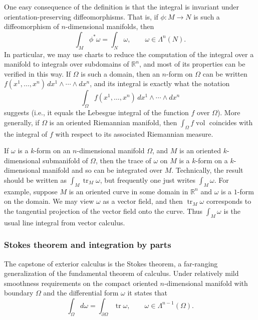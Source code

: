 {One easy consequence of the definition is that the integral is invariant under orientation-preserving diffeomorphisms. That is, if $\phi:M\to N$ is such a diffeomorphism of $n$-dimensional manifolds, then}
\begin{equation}\label{eq:integration-pullback-invariance}
\int_M\phi^*\omega=\int_N\omega,\qquad\omega\in\Lambda^n(N).
\end{equation}
{In particular, we may use charts to reduce the computation of the integral over a manifold to integrals over subdomains of $\mathbb R^n$, and most of its properties can be verified in this way. If $\Omega$ is such a domain, then an $n$-form on $\Omega$ can be written $f(x^1,\ldots,x^n)\,dx^1\wedge\cdots\wedge dx^n$, and its integral is exactly what the notation}
\[
\int_\Omega f(x^1,\ldots,x^n)\,dx^1\wedge\cdots\wedge dx^n
\]
{suggests (i.e., it equals the Lebesgue integral of the function $f$ over $\Omega$). More generally, if $\Omega$ is an oriented Riemannian manifold, then $\int_\Omega f\operatorname{vol}$ coincides with the integral of $f$ with respect to its associated Riemannian measure.}

{If $\omega$ is a $k$-form on an $n$-dimensional manifold $\Omega$, and $M$ is an oriented $k$-dimensional submanifold of $\Omega$, then the trace of $\omega$ on $M$ is a $k$-form on a $k$-dimensional manifold and so can be integrated over $M$. Technically, the result should be written as $\int_M\operatorname{tr}_M\omega$, but frequently one just writes $\int_M\omega$. For example, suppose $M$ is an oriented curve in some domain in $\mathbb R^n$ and $\omega$ is a $1$-form on the domain. We may view $\omega$ as a vector field, and then $\operatorname{tr}_M\omega$ corresponds to the tangential projection of the vector field onto the curve. Thus $\int_M\omega$ is the usual line integral from vector calculus.}

\subsubsection{{Stokes theorem and integration by parts}}\label{subsec:stokes-integration-by-parts}

{The capstone of exterior calculus is the Stokes theorem, a far-ranging generalization of the fundamental theorem of calculus. Under relatively mild smoothness requirements on the compact oriented $n$-dimensional manifold with boundary $\Omega$ and the differential form $\omega$ it states that}
\[
\int_\Omega d\omega=\int_{\partial\Omega}\operatorname{tr}\omega,\qquad\omega\in\Lambda^{n-1}(\Omega).
\]

